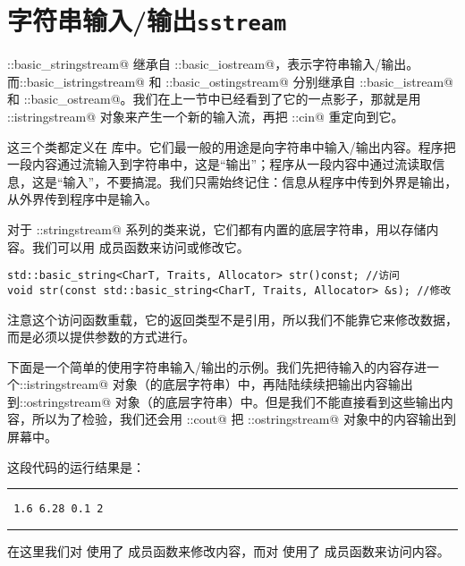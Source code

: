 \section{字符串输入/输出\texttt{sstream}}
\lstinline@std::basic_stringstream@ 继承自 \lstinline@std::basic_iostream@，表示字符串输入/输出。而\newline\lstinline@std::basic_istringstream@ 和 \lstinline@std::basic_ostingstream@ 分别继承自 \lstinline@std::basic_istream@ 和 \lstinline@std::basic_ostream@。我们在上一节中已经看到了它的一点影子，那就是用 \lstinline@std::istringstream@ 对象来产生一个新的输入流，再把 \lstinline@std::cin@ 重定向到它。\par
这三个类都定义在 \lstinline@sstream@ 库中。它们最一般的用途是向字符串中输入/输出内容。程序把一段内容通过流输入到字符串中，这是``输出''；程序从一段内容中通过流读取信息，这是``输入''，不要搞混。我们只需始终记住：信息从程序中传到外界是输出，从外界传到程序中是输入。\par
对于 \lstinline@std::stringstream@ 系列的类来说，它们都有内置的底层字符串，用以存储内容。我们可以用 \lstinline@str@ 成员函数来访问或修改它。
\begin{lstlisting}
std::basic_string<CharT, Traits, Allocator> str()const; //访问
void str(const std::basic_string<CharT, Traits, Allocator> &s); //修改
\end{lstlisting}\par
注意这个访问函数重载，它的返回类型不是引用，所以我们不能靠它来修改数据，而是必须以提供参数的方式进行。\par
下面是一个简单的使用字符串输入/输出的示例。我们先把待输入的内容存进一个\newline\lstinline@std::istringstream@ 对象（的底层字符串）中，再陆陆续续把输出内容输出到\newline\lstinline@std::ostringstream@ 对象（的底层字符串）中。但是我们不能直接看到这些输出内容，所以为了检验，我们还会用 \lstinline@std::cout@ 把 \lstinline@std::ostringstream@ 对象中的内容输出到屏幕中。\par

这段代码的运行结果是：\\\noindent\rule{\linewidth}{.2pt}\texttt{
1.6 6.28 0.1 2
}\\\noindent\rule{\linewidth}{.2pt}\par
在这里我们对 \lstinline@sin@ 使用了 \lstinline@str@ 成员函数来修改内容，而对 \lstinline@sout@ 使用了 \lstinline@str@ 成员函数来访问内容。\par
